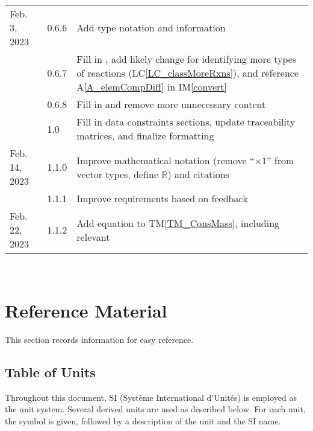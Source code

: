 \documentclass[12pt]{article}
\newcommand{\tmref}[1]{TM\ref{#1}}
\newcommand{\aref}[1]{A\ref{#1}}
\newcommand{\iref}[1]{IM\ref{#1}}
\newcommand{\lcref}[1]{LC\ref{#1}}
\begin{document}
\begin{tabularx}{\textwidth}{p{2.5cm}p{1.5cm}X}
  Feb. 3, 2023        & 0.6.6         & Add type notation and information                                    \\
                      & 0.6.7         & Fill in \nameref{sec_UCs}, add likely change for identifying
  more types of reactions (\lcref{LC_classMoreRxns}), and reference \aref{A_elemCompDiff} in \iref{convert}  \\
                      & 0.6.8         & Fill in \nameref{sec_traceMats} and remove more unnecessary content  \\
                      & 1.0           & Fill in data constraints sections, update traceability matrices, and
  finalize formatting                                                                                        \\
  Feb. 14, 2023       & 1.1.0         & Improve mathematical notation
  (remove ``$\times 1$'' from vector types, define $\mathbb{R}$) and citations                               \\
                      & 1.1.1         & Improve requirements based on feedback                               \\
  Feb. 22, 2023       & 1.1.2         & Add equation to \tmref{TM_ConsMass}, including relevant
  \nameref{sec_datatypes}                                                                                    \\
  \bottomrule
\end{tabularx}

~\newpage

\section{Reference Material} \label{sec_refMat}

This section records information for easy reference.

\subsection{Table of Units} \label{sec_ToU}

Throughout this document, SI (Syst\`{e}me International d'Unit\'{e}s) is employed
as the unit system.
Several derived units are
used as described below.  For each unit, the symbol is given, followed by a
description of the unit and the SI name.
~\newline
\end{document}
